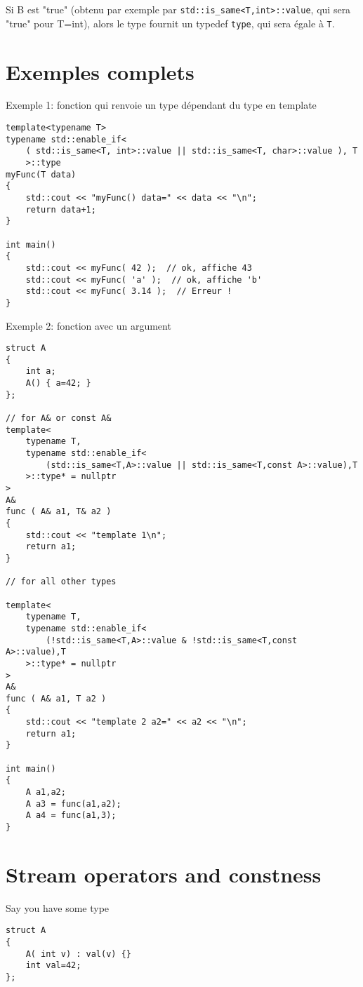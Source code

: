 \documentclass[11pt,a4paper,landscape,twocolumn]{article}
\begin{document}
Si B est "true" (obtenu par exemple par {\tt std::is\_same<T,int>::value}, qui sera "true" pour T=int), alors le type fournit un typedef {\tt type}, qui sera égale à {\tt T}.


\section{Exemples complets}


Exemple 1: fonction qui renvoie un type dépendant du type en template

\begin{lstlisting}
template<typename T>
typename std::enable_if<
	( std::is_same<T, int>::value || std::is_same<T, char>::value ), T
	>::type
myFunc(T data)
{
	std::cout << "myFunc() data=" << data << "\n";
	return data+1;
}

int main()
{
    std::cout << myFunc( 42 );  // ok, affiche 43
    std::cout << myFunc( 'a' );  // ok, affiche 'b'
    std::cout << myFunc( 3.14 );  // Erreur !        
}
\end{lstlisting}



Exemple 2: fonction avec un argument

\begin{lstlisting}
struct A
{
    int a;
    A() { a=42; }
};

// for A& or const A&
template<
	typename T,
	typename std::enable_if<
		(std::is_same<T,A>::value || std::is_same<T,const A>::value),T
	>::type* = nullptr
> 
A&
func ( A& a1, T& a2 )
{
    std::cout << "template 1\n";
    return a1;
}

// for all other types

template<
	typename T,
	typename std::enable_if<
		(!std::is_same<T,A>::value & !std::is_same<T,const A>::value),T
	>::type* = nullptr
> 
A&
func ( A& a1, T a2 )
{
    std::cout << "template 2 a2=" << a2 << "\n";
    return a1;
}
 
int main()
{
    A a1,a2;
    A a3 = func(a1,a2);
    A a4 = func(a1,3);
}
\end{lstlisting}


\section{Stream operators and constness}

Say you have some type
\begin{lstlisting}
struct A
{
	A( int v) : val(v) {}
	int val=42;
};
\end{lstlisting}
\end{document}

